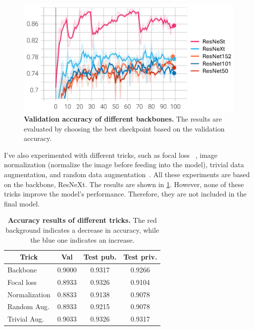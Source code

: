 \documentclass[10pt,twocolumn,letterpaper]{article}
\begin{document}
\begin{figure}[h]
  \centering
  \includegraphics[width=0.9\linewidth]{assets/exp_backbone_acc.png}
  \caption{\textbf{Validation accuracy of different backbones.} The results are
    evaluated by choosing the best checkpoint based on the validation accuracy.}
  \label{fig:exp-backbone-acc}
\end{figure}

I've also experimented with different tricks, such as focal loss~\cite{FocalLoss2017}
, image normalization (normalize the image before feeding into the model), trivial
data augmentation, and random data augmentation~\cite{PyTorch_aug}.
All these experiments are based on the backbone, ResNeXt. The results
are shown in \cref{tab:tricks}. However, none of these
tricks improve the model's performance. Therefore, they are not included in
the final model.

\begin{table}[h]
  \centering
  \begin{tabular}{lccc}
    \toprule
    \multicolumn{1}{c}{\textbf{Trick}} & \textbf{Val}                   & \textbf{Test pub.}             & \textbf{Test priv.}            \\
    \midrule
    Backbone                           & 0.9000                         & 0.9317                         & 0.9266                         \\
    \hdashline
    Focal loss                         & \cellcolor[HTML]{FFCCC9}0.8933 & \cellcolor[HTML]{CBDBFF}0.9326 & \cellcolor[HTML]{FFCCC9}0.9104 \\
    Normalization                      & \cellcolor[HTML]{FFCCC9}0.8833 & \cellcolor[HTML]{FFCCC9}0.9138 & \cellcolor[HTML]{FFCCC9}0.9078 \\
    Random Aug.                        & \cellcolor[HTML]{FFCCC9}0.8933 & \cellcolor[HTML]{FFCCC9}0.9215 & \cellcolor[HTML]{FFCCC9}0.9078 \\
    Trivial Aug.                       & \cellcolor[HTML]{CBDBFF}0.9033 & \cellcolor[HTML]{CBDBFF}0.9326 & \cellcolor[HTML]{CBDBFF}0.9317 \\
    \bottomrule
  \end{tabular}
  \caption{\textbf{Accuracy results of different tricks.} The red background
    indicates a decrease in accuracy, while the blue one indicates an increase.}
  \label{tab:tricks}
\end{table}
\end{document}
